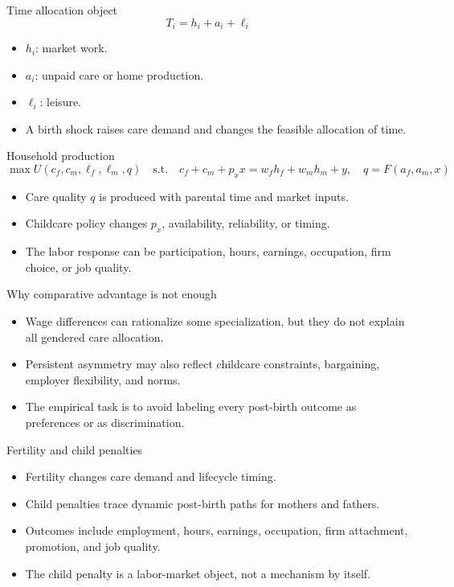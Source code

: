 \documentclass[aspectratio=169,11pt]{beamer}
\begin{document}
\begin{frame}{Time allocation object}
\[
T_i = h_i + a_i + \ell_i
\]
\begin{itemize}
    \item \(h_i\): market work.
    \item \(a_i\): unpaid care or home production.
    \item \(\ell_i\): leisure.
    \item A birth shock raises care demand and changes the feasible allocation of time.
\end{itemize}
\end{frame}

\begin{frame}{Household production}
\[
\max U(c_f,c_m,\ell_f,\ell_m,q)
\quad \text{s.t.} \quad
c_f+c_m+p_xx=w_fh_f+w_mh_m+y,
\quad q=F(a_f,a_m,x)
\]
\begin{itemize}
    \item Care quality \(q\) is produced with parental time and market inputs.
    \item Childcare policy changes \(p_x\), availability, reliability, or timing.
    \item The labor response can be participation, hours, earnings, occupation, firm choice, or job quality.
\end{itemize}
\end{frame}

\begin{frame}{Why comparative advantage is not enough}
\begin{itemize}
    \item Wage differences can rationalize some specialization, but they do not explain all gendered care allocation.
    \item Persistent asymmetry may also reflect childcare constraints, bargaining, employer flexibility, and norms.
    \item The empirical task is to avoid labeling every post-birth outcome as preferences or as discrimination.
\end{itemize}
\end{frame}

\begin{frame}{Fertility and child penalties}
\begin{itemize}
    \item Fertility changes care demand and lifecycle timing.
    \item Child penalties trace dynamic post-birth paths for mothers and fathers.
    \item Outcomes include employment, hours, earnings, occupation, firm attachment, promotion, and job quality.
    \item The child penalty is a labor-market object, not a mechanism by itself.
\end{itemize}
\end{frame}
\end{document}
